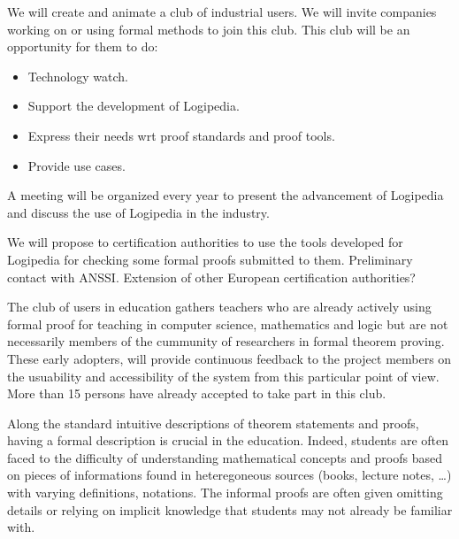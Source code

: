 \begin{workpackage}[id=dissemination,wphases=0-48,type=MGT,
  short=Dissemination,%
  title={Dissemination, communication and exploitation},
  lead=Inr]
\begin{tasklist}
  \begin{task}[id=industrial-club,
      title=Expanding the use of Logipedia in the industry,
      lead=Irt,IrtRM=2]
    We will create and animate a club of industrial users. We will
    invite companies working on or using formal methods to join this
    club. This club will be an opportunity for them to do:
    \begin{itemize}
    \item Technology watch.
    \item Support the development of Logipedia.
    \item Express their needs wrt proof standards and proof tools.
    \item Provide use cases.
    \end{itemize}
    A meeting will be organized every year to present the advancement
    of Logipedia and discuss the use of Logipedia in the industry.
  \end{task}

  \begin{task}[id=certif-club,
      title=Expanding the use of Logipedia within certification authorities,
      lead=Irt,IrtRM=2]
    We will propose to certification authorities to use the tools
    developed for Logipedia for checking some formal proofs submitted
    to them. Preliminary contact with ANSSI. Extension of other
    European certification authorities?
  \end{task}

  \begin{task}[id=teachers-club,
      title=Expanding the use of Logipedia in education,
      lead=Str,StrRM=2] The club of users in education gathers
    teachers who are already actively using formal proof for teaching
    in computer science, mathematics and logic but are not necessarily
    members of the cummunity of researchers in formal theorem
    proving. These early adopters, will provide continuous feedback to
    the project members on the usuability and accessibility of the
    system from this particular point of view.  More than 15 persons
    have already accepted to take part in this club.

    Along the standard intuitive descriptions of theorem statements
    and proofs, having a formal description is crucial in the
    education. Indeed, students are often faced to the difficulty of
    understanding mathematical concepts and proofs based on pieces of
    informations found in heteregoneous sources (books, lecture notes,
    \ldots) with varying definitions, notations. The informal proofs
    are often given omitting details or relying on implicit knowledge
    that students may not already be familiar with.


\end{task}
\end{tasklist}
\end{workpackage}
